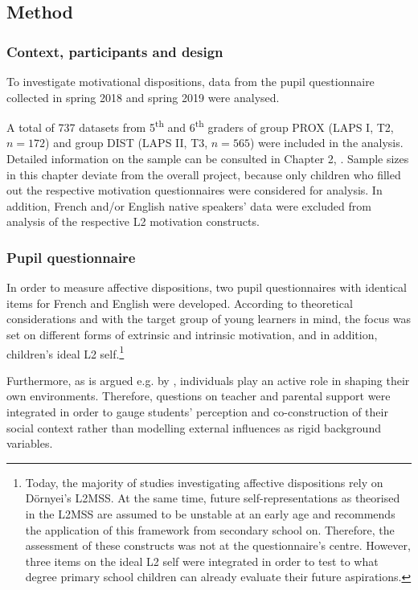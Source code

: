 \documentclass[output=paper]{langsci/langscibook}
\begin{document}
 \subsection{Method}
 \subsubsection{Context, participants and design}

To investigate motivational dispositions, data from the pupil questionnaire collected in spring 2018 and spring 2019 were analysed. 

A total of 737 datasets from 5\textsuperscript{th} and 6\textsuperscript{th} graders of group PROX (LAPS I, T2, $n=172$) and group DIST (LAPS II, T3, $n=565$) were included in the analysis. Detailed information on the sample can be consulted in Chapter 2, . Sample sizes in this chapter deviate from the overall project, because only children who filled out the respective motivation questionnaires were considered for analysis. In addition, French and/or English native speakers’ data were excluded from analysis of the respective L2 motivation constructs.


\subsubsection{Pupil questionnaire}


In order to measure affective dispositions, two pupil questionnaires with identical items for French and English were developed. According to theoretical considerations and with the target group of young learners in mind, the focus was set on different forms of extrinsic and intrinsic motivation, and in addition, children’s ideal L2 self.\footnote{Today, the majority of studies investigating affective dispositions rely on Dörnyei’s L2MSS. At the same time, future self-representations as theorised in the L2MSS are assumed to be unstable at an early age and \citet{Doernyei2009} recommends the application of this framework from secondary school on. Therefore, the assessment of these constructs was not at the questionnaire’s centre. However, three items on the ideal L2 self were integrated in order to test to what degree primary school children can already evaluate their future aspirations.} 

Furthermore, as is argued e.g. by \citet{Ushioda2009}, individuals play an active role in shaping their own environments. Therefore, questions on teacher and parental support were integrated in order to gauge students’ perception and co-construction of their social context rather than modelling external influences as rigid background variables.
\end{document}
